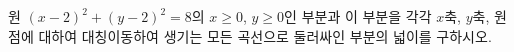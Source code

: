 원 $(x-2)^2+(y-2)^2=8$의 $x\ge 0$, $y\ge 0$인 부분과 이 부분을 각각 $x$축, $y$축, 원점에 대하여 대칭이동하여 생기는 모든 곡선으로 둘러싸인 부분의 넓이를 구하시오.

